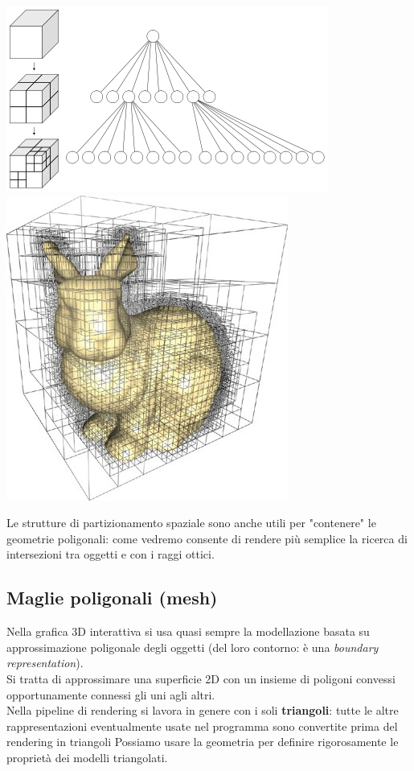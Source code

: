 \documentclass[a4paper, 10pt]{article}
\begin{document}
			\includegraphics[scale=0.4]{octree}
			\hspace{2.5cm}
			\includegraphics[scale=0.3]{octree2}
			
			Le strutture di partizionamento spaziale sono anche utili per
			"contenere" le geometrie poligonali: come vedremo consente
			di rendere più semplice la ricerca di intersezioni tra oggetti e
			con i raggi ottici.
			
	\subsection{Maglie poligonali (mesh)}
		Nella grafica 3D interattiva si usa quasi sempre la modellazione
		basata su approssimazione poligonale degli oggetti (del loro
		contorno: è una \textit{boundary representation}).\\
		Si tratta di approssimare una superficie 2D con un insieme di
		poligoni convessi opportunamente connessi gli uni agli altri.\\
		Nella pipeline di rendering si lavora in genere con i soli
		\textbf{triangoli}:
		tutte le altre rappresentazioni eventualmente usate nel programma
		sono convertite prima del rendering in triangoli
		Possiamo usare la geometria per definire rigorosamente le
		proprietà dei modelli triangolati.
		
\end{document}
